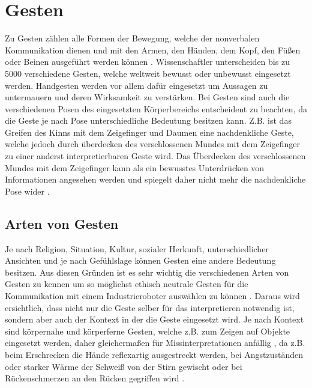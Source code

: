 \section{Gesten}
Zu Gesten zählen alle Formen der Bewegung, welche der nonverbalen Kommunikation dienen und mit den Armen, den Händen, dem Kopf, den Füßen oder Beinen ausgeführt werden können \cite{gestik_2020}. Wissenschaftler unterscheiden bis zu 5000 verschiedene Gesten, welche weltweit bewusst oder unbewusst eingesetzt werden. Handgesten werden vor allem dafür eingesetzt um Aussagen zu untermauern und deren Wirksamkeit zu verstärken. Bei Gesten sind auch die verschiedenen Posen des eingesetzten Körperbereichs entscheident zu beachten, da die Geste je nach Pose unterschiedliche Bedeutung besitzen kann. Z.B. ist das Greifen des Kinns mit dem Zeigefinger und Daumen eine nachdenkliche Geste, welche jedoch durch überdecken des verschlossenen Mundes mit dem Zeigefinger zu einer anderst interpretierbaren Geste wird. Das Überdecken des verschlossenen Mundes mit dem Zeigefinger kann als ein bewusstes Unterdrücken von Informationen angesehen werden und spiegelt daher nicht mehr die nachdenkliche Pose wider \cite[137\psq]{matschnig_korpersprache_2007}.

\subsection{Arten von Gesten}
Je nach Religion, Situation, Kultur, sozialer Herkunft, unterschiedlicher Ansichten und je nach Gefühlslage können Gesten eine andere Bedeutung besitzen. Aus diesen Gründen ist es sehr wichtig die verschiedenen Arten von Gesten zu kennen um so möglichst ethisch neutrale Gesten für die Kommunikation mit einem Industrieroboter auswählen zu können \cite{gesten_liste_2020}. Daraus wird ersichtlich, dass nicht nur die Geste selber für das interpretieren notwendig ist, sondern aber auch der Kontext in der die Geste eingesetzt wird. Je nach Kontext sind körpernahe und körperferne Gesten, welche z.B. zum Zeigen auf Objekte eingesetzt werden, daher gleichermaßen für Missinterpretationen anfällig \cite[137\psq]{matschnig_korpersprache_2007}, da z.B. beim Erschrecken die Hände reflexartig ausgestreckt werden, bei Angstzuständen oder starker Wärme der Schweiß von der Stirn gewischt oder bei Rückenschmerzen an den Rücken gegriffen wird \cite{matschnig_glossar_nodate}.\\

